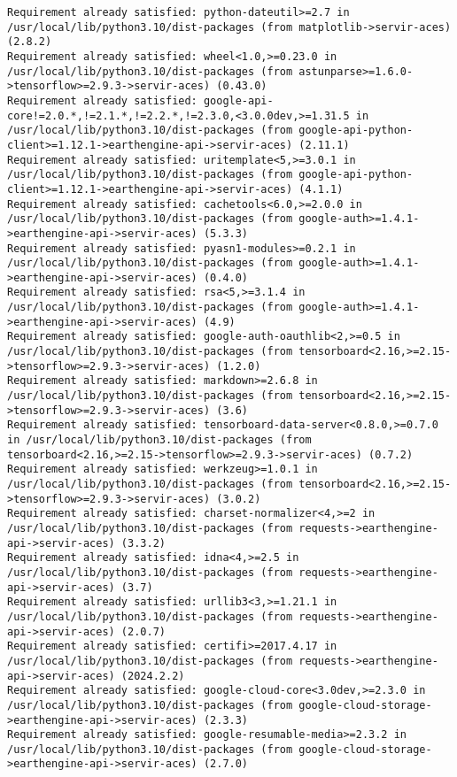 \documentclass[
  letterpaper,
  DIV=11,
  numbers=noendperiod]{scrreprt}
\begin{document}
\begin{verbatim}
Requirement already satisfied: python-dateutil>=2.7 in /usr/local/lib/python3.10/dist-packages (from matplotlib->servir-aces) (2.8.2)
Requirement already satisfied: wheel<1.0,>=0.23.0 in /usr/local/lib/python3.10/dist-packages (from astunparse>=1.6.0->tensorflow>=2.9.3->servir-aces) (0.43.0)
Requirement already satisfied: google-api-core!=2.0.*,!=2.1.*,!=2.2.*,!=2.3.0,<3.0.0dev,>=1.31.5 in /usr/local/lib/python3.10/dist-packages (from google-api-python-client>=1.12.1->earthengine-api->servir-aces) (2.11.1)
Requirement already satisfied: uritemplate<5,>=3.0.1 in /usr/local/lib/python3.10/dist-packages (from google-api-python-client>=1.12.1->earthengine-api->servir-aces) (4.1.1)
Requirement already satisfied: cachetools<6.0,>=2.0.0 in /usr/local/lib/python3.10/dist-packages (from google-auth>=1.4.1->earthengine-api->servir-aces) (5.3.3)
Requirement already satisfied: pyasn1-modules>=0.2.1 in /usr/local/lib/python3.10/dist-packages (from google-auth>=1.4.1->earthengine-api->servir-aces) (0.4.0)
Requirement already satisfied: rsa<5,>=3.1.4 in /usr/local/lib/python3.10/dist-packages (from google-auth>=1.4.1->earthengine-api->servir-aces) (4.9)
Requirement already satisfied: google-auth-oauthlib<2,>=0.5 in /usr/local/lib/python3.10/dist-packages (from tensorboard<2.16,>=2.15->tensorflow>=2.9.3->servir-aces) (1.2.0)
Requirement already satisfied: markdown>=2.6.8 in /usr/local/lib/python3.10/dist-packages (from tensorboard<2.16,>=2.15->tensorflow>=2.9.3->servir-aces) (3.6)
Requirement already satisfied: tensorboard-data-server<0.8.0,>=0.7.0 in /usr/local/lib/python3.10/dist-packages (from tensorboard<2.16,>=2.15->tensorflow>=2.9.3->servir-aces) (0.7.2)
Requirement already satisfied: werkzeug>=1.0.1 in /usr/local/lib/python3.10/dist-packages (from tensorboard<2.16,>=2.15->tensorflow>=2.9.3->servir-aces) (3.0.2)
Requirement already satisfied: charset-normalizer<4,>=2 in /usr/local/lib/python3.10/dist-packages (from requests->earthengine-api->servir-aces) (3.3.2)
Requirement already satisfied: idna<4,>=2.5 in /usr/local/lib/python3.10/dist-packages (from requests->earthengine-api->servir-aces) (3.7)
Requirement already satisfied: urllib3<3,>=1.21.1 in /usr/local/lib/python3.10/dist-packages (from requests->earthengine-api->servir-aces) (2.0.7)
Requirement already satisfied: certifi>=2017.4.17 in /usr/local/lib/python3.10/dist-packages (from requests->earthengine-api->servir-aces) (2024.2.2)
Requirement already satisfied: google-cloud-core<3.0dev,>=2.3.0 in /usr/local/lib/python3.10/dist-packages (from google-cloud-storage->earthengine-api->servir-aces) (2.3.3)
Requirement already satisfied: google-resumable-media>=2.3.2 in /usr/local/lib/python3.10/dist-packages (from google-cloud-storage->earthengine-api->servir-aces) (2.7.0)

\end{verbatim}
\end{document}
